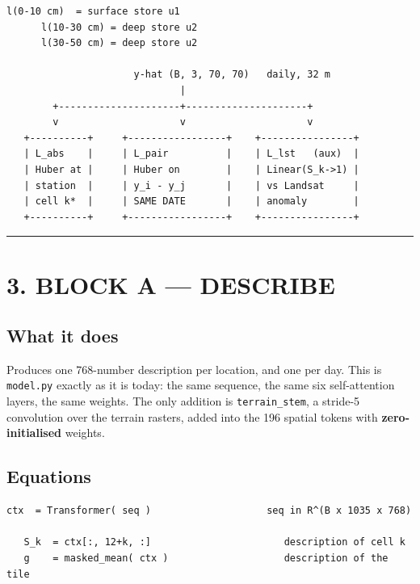 \documentclass[10pt,a4paper]{article}
\begin{document}
\begin{Verbatim}[fontsize=\scriptsize,frame=leftline,framerule=0.6pt,rulecolor=\color{rulegray},xleftmargin=6pt,framesep=6pt,]
      l(0-10 cm)  = surface store u1
      l(10-30 cm) = deep store u2
      l(30-50 cm) = deep store u2

                      y-hat (B, 3, 70, 70)   daily, 32 m
                              |
        +---------------------+---------------------+
        v                     v                     v
   +----------+     +-----------------+    +----------------+
   | L_abs    |     | L_pair          |    | L_lst   (aux)  |
   | Huber at |     | Huber on        |    | Linear(S_k->1) |
   | station  |     | y_i - y_j       |    | vs Landsat     |
   | cell k*  |     | SAME DATE       |    | anomaly        |
   +----------+     +-----------------+    +----------------+
\end{Verbatim}

\medskip\hrule\medskip

\section*{3. BLOCK A — DESCRIBE}

\subsection*{What it does}

Produces one 768-number description per location, and one per day. This is
\texttt{model.py} exactly as it is today: the same sequence, the same six
self-attention layers, the same weights. The only addition is \texttt{terrain\_stem},
a stride-5 convolution over the terrain rasters, added into the 196 spatial
tokens with \textbf{zero-initialised} weights.

\subsection*{Equations}

\begin{Verbatim}[fontsize=\scriptsize,frame=leftline,framerule=0.6pt,rulecolor=\color{rulegray},xleftmargin=6pt,framesep=6pt,]
   ctx  = Transformer( seq )                    seq in R^(B x 1035 x 768)

   S_k  = ctx[:, 12+k, :]                       description of cell k
   g    = masked_mean( ctx )                    description of the tile
\end{Verbatim}
\end{document}
